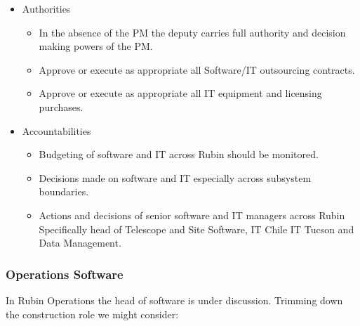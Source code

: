 \begin{itemize}
\begin{itemize}
\end{itemize}
\item Authorities
\begin{itemize}
\item  In the absence of the PM the deputy carries full authority and decision making powers
of the PM.
\item Approve or execute as appropriate all Software/IT outsourcing contracts.
\item Approve or execute as appropriate all IT equipment and licensing purchases.
\end{itemize}
\item Accountabilities
\begin{itemize}
\item Budgeting of software and IT across Rubin should be monitored.
\item Decisions made on software and IT especially across subsystem boundaries.
\item Actions and decisions of senior software and IT managers across Rubin Specifically head of Telescope and Site Software, IT Chile IT Tucson and Data Management.

\end{itemize}
\end{itemize}


\subsubsection{Operations Software} \label{sec:opssw}

In Rubin Operations the  head of software is under  discussion.
Trimming down the construction role we might consider:

